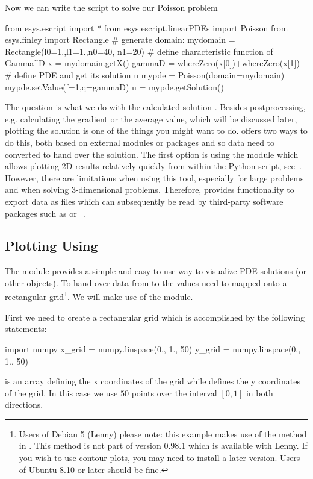 Now we can write the script to solve our Poisson problem
\begin{python}
  from esys.escript import *
  from esys.escript.linearPDEs import Poisson
  from esys.finley import Rectangle
  # generate domain:
  mydomain = Rectangle(l0=1.,l1=1.,n0=40, n1=20)
  # define characteristic function of Gamma^D
  x = mydomain.getX()
  gammaD = whereZero(x[0])+whereZero(x[1])
  # define PDE and get its solution u
  mypde = Poisson(domain=mydomain)
  mypde.setValue(f=1,q=gammaD)
  u = mypde.getSolution()
\end{python}
The question is what we do with the calculated solution .
Besides postprocessing, e.g. calculating the gradient or the average value, which will be discussed later, plotting the solution is one of the things you might want to do.
\escript offers two ways to do this, both based on external modules or packages and so data need to converted to hand over the solution.
The first option is using the \MATPLOTLIB module which allows plotting 2D results relatively quickly from within the Python script, see~\cite{matplotlib}.
However, there are limitations when using this tool, especially for large problems and when solving 3-dimensional problems.
Therefore, \escript provides functionality to export data as files which can subsequently be read by third-party software packages such as \mayavi\cite{mayavi} or \VisIt~\cite{VisIt}.

\subsection{Plotting Using \MATPLOTLIB}
The \MATPLOTLIB module provides a simple and easy-to-use way to visualize PDE solutions (or other \Data objects).
To hand over data from \escript to \MATPLOTLIB the values need to mapped onto
a rectangular grid\footnote{Users of Debian 5 (Lenny) please note: this example
makes use of the  method in .
This method is not part of version 0.98.1 which is available with Lenny.
If you wish to use contour plots, you may need to install a later version.
Users of Ubuntu 8.10 or later should be fine.}. We will make use of the \numpy module.

First we need to create a rectangular grid which is accomplished by the following statements:
\begin{python}
  import numpy
  x_grid = numpy.linspace(0., 1., 50)
  y_grid = numpy.linspace(0., 1., 50)
\end{python}
 is an array defining the x coordinates of the grid while
 defines the y coordinates of the grid.
In this case we use $50$ points over the interval $[0,1]$ in both directions. 

